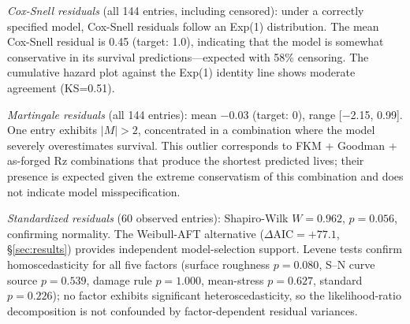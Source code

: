 \documentclass[twocolumn,12pt,a4paper]{article}
\begin{document}
\begin{enumerate}
        \textit{Cox-Snell residuals} (all 144 entries, including censored):
        under a correctly specified model, Cox-Snell residuals follow
        an Exp(1) distribution. The mean Cox-Snell residual is 0.45
        (target: 1.0), indicating that the model is somewhat
        conservative in its survival predictions---expected with
        58\% censoring. The cumulative hazard plot against the
        Exp(1) identity line shows moderate agreement (KS=0.51).

        \textit{Martingale residuals} (all 144 entries): mean $-$0.03
        (target: 0), range [$-$2.15, 0.99]. One entry exhibits
        $|M| > 2$, concentrated in a combination where the model
        severely overestimates survival. This outlier corresponds to
        FKM + Goodman + as-forged Rz combinations that produce the
        shortest predicted lives; their presence is expected given the
        extreme conservatism of this combination and does not indicate
        model misspecification.

        \textit{Standardized residuals} (60 observed entries):
        Shapiro-Wilk $W=0.962$, $p=0.056$, confirming normality.
        The Weibull-AFT alternative ($\Delta\mathrm{AIC}=+77.1$,
        \S\ref{sec:results}) provides independent model-selection
        support. Levene tests confirm homoscedasticity for all five
        factors (surface roughness $p=0.080$, S--N curve source
        $p=0.539$, damage rule $p=1.000$, mean-stress $p=0.627$,
        standard $p=0.226$); no factor exhibits significant
        heteroscedasticity, so the likelihood-ratio decomposition is
        not confounded by factor-dependent residual variances.


\end{enumerate}
\end{document}
